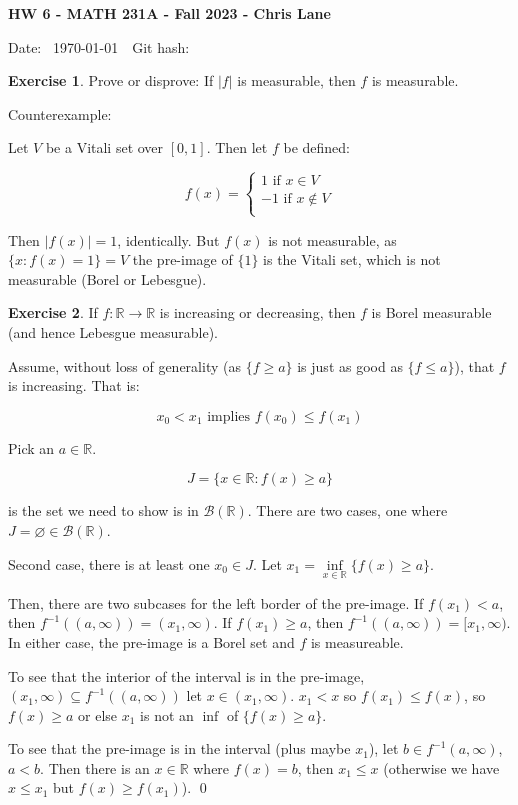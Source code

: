 \documentclass[11pt,oneside]{article}
\numberwithin{equation}{section}
\theoremstyle{definition}
\newtheorem{exercise}{Exercise}
\def\RR{\mathbb{R}}
\def\fancyB{\mathscr{B}}
\begin{document}
\textbf{HW 6 - MATH 231A - Fall 2023 - Chris Lane}

Date: \hhmmsstime{} \ \today \ \ Git hash: 
 
\begin{exercise}
  Prove or disprove: If $ |f| $ is measurable, then $f$ is measurable.
\end{exercise}
\begin{solution}
  Counterexample:

  Let $V$ be a Vitali set over $[0,1]$.  Then let $f$ be defined:

  $$
  f(x) = \begin{cases}
    1 \textrm{ if } x \in V \\
    -1 \textrm{ if } x \notin V \\
  \end{cases}
  $$

  Then $|f(x)| = 1$, identically.  But $f(x)$ is not measurable, as $
  \{ x : f(x) = 1 \} = V$ the pre-image of $\{1\}$ is the Vitali set,
  which is not measurable (Borel or Lebesgue).
\end{solution}

\begin{exercise}
  If $ f: \RR \to \RR$ is increasing or decreasing, then $f$ is Borel
  measurable (and hence Lebesgue measurable).
\end{exercise}
\begin{solution}

  Assume, without loss of generality (as $ \{ f \geq a \} $ is just as good as $ \{ f \leq a \}$),
  that $f$ is increasing.  That is:

  $$
  x_0 < x_1 \text { implies } f(x_0) \leq f(x_1)
  $$

  Pick an $a \in \RR$.

  $$
  J = \{ x \in \RR : f(x) \geq a \}
  $$

  is the set we need to show is in $\fancyB(\RR)$.  There are two cases, one
  where $ J = \varnothing \in \fancyB(\RR)$.

  Second case, there is at least one $x_0 \in J$.
  Let $x_1 = \inf \limits _ { x \in \RR } \{ f(x) \geq a \}$.
  
  Then, there are two subcases for the left border of the pre-image.
  If $f(x_1) < a$, then $f^{-1} ((a, \infty)) = (x_1, \infty)$.
  If $f(x_1) \geq a$,
  then $f^{-1} ((a, \infty)) = [x_1, \infty)$.  In either case, the pre-image is a Borel
  set and $f$ is measureable.

  To see that the interior of the interval is in the pre-image,
  $(x_1, \infty) \subseteq f^{-1}((a, \infty))$ let $x \in (x_1, \infty)$.  $x_1 < x$
  so $f(x_1) \leq f(x)$, so $f(x) \geq a$
  or else $x_1$ is not an $\inf $ of $ \{ f(x) \geq a \}$.  
  
  To see that the pre-image is in the interval (plus maybe $x_1$),
  let $b \in f^{-1}(a, \infty)$, $a<b$. Then there is an $x \in \RR$ where $f(x) = b$,
  then $x_1 \leq x$ (otherwise we have $x \leq x_1$  but $f(x) \geq f(x_1)$).  \qed
  
\end{solution}
\end{document}
